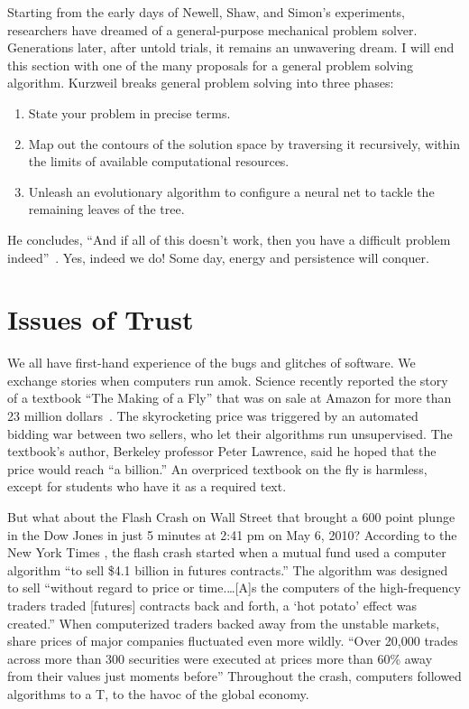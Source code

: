 \documentclass{llncs}
\begin{document}

\bigskip

Starting from the early days of Newell, Shaw, and Simon's experiments,
researchers have dreamed of a general-purpose mechanical problem
solver.  Generations later, after untold trials, it remains an
unwavering dream.  I will end this section with one of the many
proposals for a general problem solving algorithm.  Kurzweil breaks
general problem solving into three phases:
\begin{enumerate} 
\item State your problem in precise terms.
\item Map out the contours of the solution space by traversing it
  recursively, within the limits of available computational resources.
\item Unleash an evolutionary algorithm to configure a neural net to
  tackle the remaining leaves of the tree.
\end{enumerate}
He concludes, ``And if all of this doesn't work, then you have a
difficult problem indeed''~\cite{Ku99}.  Yes, indeed we do!  Some day,
energy and persistence will conquer.



\newpage
\section{Issues of Trust}\label{sec:trust}

We all have first-hand experience of the bugs and glitches of
software.  We exchange stories when computers run amok.  Science
recently reported the story of a textbook ``The Making of a Fly'' that
was on sale at Amazon for more than 23 million dollars~\cite{Sci11}.
The skyrocketing price was triggered by an automated bidding war
between two sellers, who let their algorithms run unsupervised.  The
textbook's author, Berkeley professor Peter Lawrence, said he hoped
that the price would reach ``a billion.''
An overpriced textbook on the fly is harmless, except for students who
have it as a required text.  

But what about the Flash Crash on Wall
Street that brought a 600 point plunge in the Dow Jones in just 5
minutes at 2:41 pm on May 6, 2010?  According to the New York Times
\cite{NYT2010}, the flash crash started when a mutual fund used a
computer algorithm ``to sell \$4.1 billion in futures contracts.''
The algorithm was designed to sell ``without regard to price or
time.\dots [A]s the computers of the high-frequency traders traded
[futures] contracts back and forth, a `hot potato' effect was
created.''  When computerized traders backed away from the unstable
markets, share prices of major companies fluctuated even more
wildly. ``Over 20,000 trades across more than 300 securities were
executed at prices more than 60\% away from their values just moments
before'' \cite{SEC2010} Throughout the crash, computers followed
algorithms to a T, to the havoc of the global economy.
\end{document}
